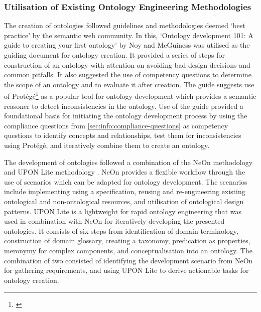 \subsubsection*{Utilisation of Existing Ontology Engineering Methodologies}
The creation of ontologies followed guidelines and methodologies deemed `best practice' by the semantic web community. In this, `Ontology development 101: A guide to creating your first ontology' by Noy and McGuiness \cite{} was utilised as the guiding document for ontology creation. It provided a series of steps for construction of an ontology with attention on avoiding bad design decisions and common pitfalls. It also suggested the use of competency questions to determine the scope of an ontology and to evaluate it after creation. 
The guide suggests use of Protégé\footnote{\url{}} \cite{} as a popular tool for ontology development which provides a semantic reasoner to detect inconsistencies in the ontology.
Use of the guide provided a foundational basis for initiating the ontology development process by using the compliance questions from \autoref{sec:info:compliance-questions} as competency questions to identify concepts and relationships, test them for inconsistencies using Protégé, and iteratively combine them to create an ontology. 

The development of ontologies followed a combination of the NeOn methodology \cite{} and UPON Lite methodology \cite{}. NeOn provides a flexible workflow through the use of scenarios which can be adapted for ontology development. The scenarios include implementing using a specification, reusing and re-engineering existing ontological and non-ontological resources, and utilisation of ontological design patterns. 
UPON Lite \cite{} is a lightweight for rapid ontology engineering that was used in combination with NeOn for iteratively developing the presented ontologies. It consists of six steps from identification of domain terminology, construction of domain glossary, creating a taxonomy, predication as properties, meronymy for complex components, and conceptualisation into an ontology.
The combination of two consisted of identifying the development scenario from NeOn for gathering requirements, and using UPON Lite to derive actionable tasks for ontology creation.

